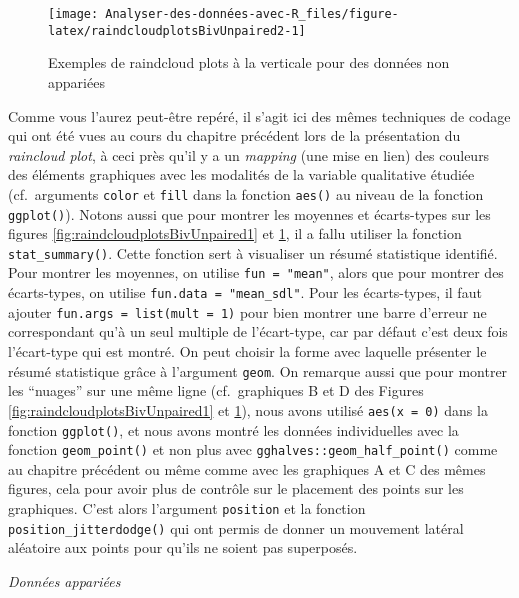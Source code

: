 \documentclass[
  french,
]{book}
\begin{document}
\begin{figure}

{\centering \texttt{[image: Analyser-des-données-avec-R\_files/figure-latex/raindcloudplotsBivUnpaired2-1]} 

}

\caption{Exemples de raindcloud plots à la verticale pour des données non appariées}\label{fig:raindcloudplotsBivUnpaired2}
\end{figure}

Comme vous l'aurez peut-être repéré, il s'agit ici des mêmes techniques de codage qui ont été vues au cours du chapitre précédent lors de la présentation du \emph{raincloud plot}, à ceci près qu'il y a un \emph{mapping} (une mise en lien) des couleurs des éléments graphiques avec les modalités de la variable qualitative étudiée (cf.~arguments \texttt{color} et \texttt{fill} dans la fonction \texttt{aes()} au niveau de la fonction \texttt{ggplot()}). Notons aussi que pour montrer les moyennes et écarts-types sur les figures \ref{fig:raindcloudplotsBivUnpaired1} et \ref{fig:raindcloudplotsBivUnpaired2}, il a fallu utiliser la fonction \texttt{stat\_summary()}. Cette fonction sert à visualiser un résumé statistique identifié. Pour montrer les moyennes, on utilise \texttt{fun\ =\ "mean"}, alors que pour montrer des écarts-types, on utilise \texttt{fun.data\ =\ "mean\_sdl"}. Pour les écarts-types, il faut ajouter \texttt{fun.args\ =\ list(mult\ =\ 1)} pour bien montrer une barre d'erreur ne correspondant qu'à un seul multiple de l'écart-type, car par défaut c'est deux fois l'écart-type qui est montré. On peut choisir la forme avec laquelle présenter le résumé statistique grâce à l'argument \texttt{geom}. On remarque aussi que pour montrer les \enquote{nuages} sur une même ligne (cf.~graphiques B et D des Figures \ref{fig:raindcloudplotsBivUnpaired1} et \ref{fig:raindcloudplotsBivUnpaired2}), nous avons utilisé \texttt{aes(x\ =\ 0)} dans la fonction \texttt{ggplot()}, et nous avons montré les données individuelles avec la fonction \texttt{geom\_point()} et non plus avec \texttt{gghalves::geom\_half\_point()} comme au chapitre précédent ou même comme avec les graphiques A et C des mêmes figures, cela pour avoir plus de contrôle sur le placement des points sur les graphiques. C'est alors l'argument \texttt{position} et la fonction \texttt{position\_jitterdodge()} qui ont permis de donner un mouvement latéral aléatoire aux points pour qu'ils ne soient pas superposés.

\emph{Données appariées}
\end{document}
